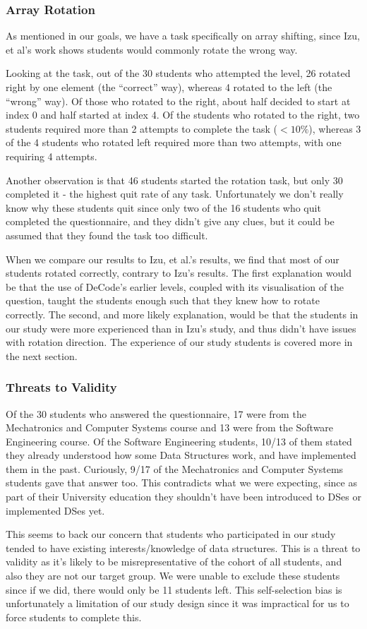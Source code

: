 \documentclass[11pt]{article}
\begin{document}
\subsubsection{Array Rotation}
As mentioned in our goals, we have a task specifically on array shifting, since Izu, et al\cite{izuloop}'s work shows students would commonly rotate the wrong way.\par
Looking at the task, out of the 30 students who attempted the level, 26 rotated right by one element (the ``correct'' way), whereas 4 rotated to the left (the ``wrong'' way). Of those who rotated to the right, about half decided to start at index 0 and half started at index 4. Of the students who rotated to the right, two students required more than 2 attempts to complete the task ($<10\%$), whereas 3 of the 4 students who rotated left required more than two attempts, with one requiring 4 attempts.\par
Another observation is that 46 students started the rotation task, but only 30 completed it - the highest quit rate of any task. Unfortunately we don't really know why these students quit since only two of the 16 students who quit completed the questionnaire, and they didn't give any clues, but it could be assumed that they found the task too difficult.\par
When we compare our results to Izu, et al.\cite{izuloop}'s results, we find that most of our students rotated correctly, contrary to Izu's results. The first explanation would be that the use of DeCode's earlier levels, coupled with its visualisation of the question, taught the students enough such that they knew how to rotate correctly. The second, and more likely explanation, would be that the students in our study were more experienced than in Izu's study, and thus didn't have issues with rotation direction. The experience of our study students is covered more in the next section.
\subsubsection{Threats to Validity}
\label{studycohort}
Of the 30 students who answered the questionnaire, 17 were from the Mechatronics and Computer Systems course and 13 were from the Software Engineering course. Of the Software Engineering students, 10/13 of them stated they already understood how some Data Structures work, and have implemented them in the past. Curiously, 9/17 of the Mechatronics and Computer Systems students gave that answer too. This contradicts what we were expecting, since as part of their University education they shouldn't have been introduced to DSes or implemented DSes yet.\par
This seems to back our concern that students who participated in our study tended to have existing interests/knowledge of data structures. This is a threat to validity as it's likely to be misrepresentative of the cohort of all students, and also they are not our target group. We were unable to exclude these students since if we did, there would only be 11 students left. This self-selection bias is unfortunately a limitation of our study design since it was impractical for us to force students to complete this.
\end{document}
